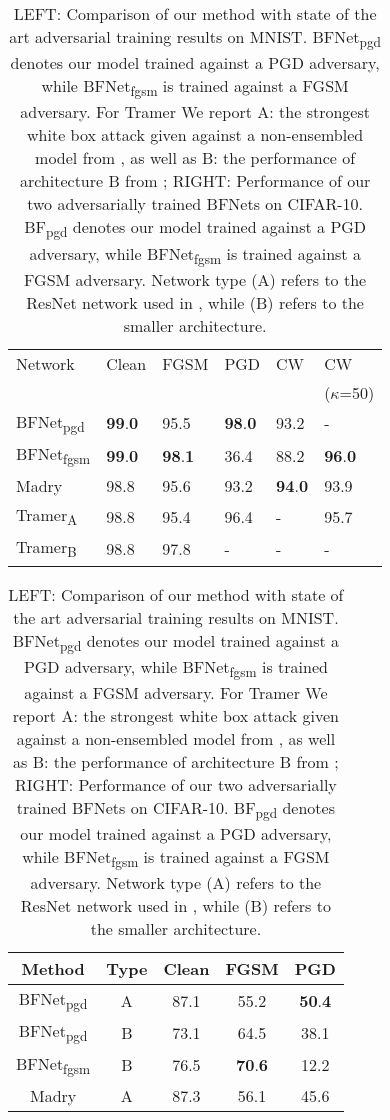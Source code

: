 \documentclass{article} %
\begin{document}
\begin{table}[htb]
\vskip -0.05in
\begin{tabular}{@{}llllll@{}} \toprule{Network} & {Clean} & {FGSM} & {PGD} & {CW} & {CW} \\
    & & & & & ($\kappa$=50) \\\midrule{BFNet\textsubscript{pgd}}   & \textbf{99}.\textbf{0} &  95.5  & \textbf{98}.\textbf{0} & 93.2   & {-}   \\
    {BFNet\textsubscript{fgsm}}  & \textbf{99}.\textbf{0} & \textbf{98}.\textbf{1} & 36.4 & 88.2     & \textbf{96}.\textbf{0} \\
    {Madry}                   & 98.8 & 95.6 & 93.2 & \textbf{94}.\textbf{0} & 93.9 \\ 
    {Tramer\textsubscript{A}}  & 98.8 & 95.4 & 96.4 & {-}  & 95.7 \\
    {Tramer\textsubscript{B}}  & 98.8 & 97.8 & {-} & {-}   & {-}  \\ \bottomrule

\end{tabular}
\begin{tabular}{ccccc@{}} \toprule{Method} & {Type} & {Clean}  & {FGSM} & {PGD} \\ \midrule{BFNet\textsubscript{pgd}}  & {A}  & 87.1 &  55.2  & \textbf{50}.\textbf{4}  \\
    {BFNet\textsubscript{pgd}}  & {B}  & 73.1 &  64.5  & 38.1 \\
    {BFNet\textsubscript{fgsm}} & {B}  & 76.5 & \textbf{70}.\textbf{6} & 12.2  \\
    {Madry}              & {A}  & 87.3 & 56.1 & 45.6  \\ \bottomrule
\end{tabular}
\vskip -0.05in
\caption{ LEFT: Comparison of our method with state of the art adversarial training results on MNIST. BFNet\textsubscript{pgd} denotes our model trained against a PGD adversary, while BFNet\textsubscript{fgsm} is trained against a FGSM adversary. For Tramer We report A: the strongest white box attack given against a non-ensembled model from \citep{tramer2017ensemble}, as well as B: the performance of architecture B from \citep{madry2017towards}; RIGHT: Performance of our two adversarially trained BFNets on CIFAR-10. BF\textsubscript{pgd} denotes our model trained against a PGD adversary, while BFNet\textsubscript{fgsm} is trained against a FGSM adversary. Network type (A) refers to the ResNet network used in \citep{madry2017towards}, while (B) refers to the smaller architecture.}\label{tab:mnist}
\vskip -0.1in
\end{table}
\end{document}
